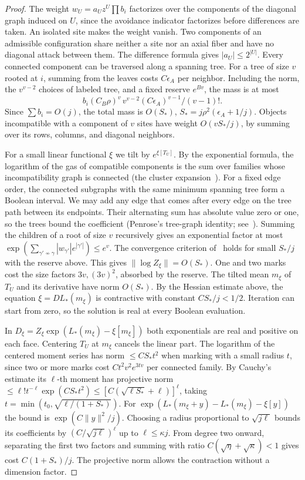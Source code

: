 \begin{proof}
The weight \(w_U=a_Uz^U\prod b_i\) factorizes over the components of the diagonal graph induced on \(U\),
since the avoidance indicator factorizes before differences are taken. An isolated site makes the weight
vanish. Two components of an admissible configuration share neither a site nor an axial fiber and have no
diagonal attack between them. The difference formula gives \(|a_U|\le2^{|U|}\). Every connected component
can be traversed along a spanning tree. For a tree of size \(v\) rooted at \(i\), summing from the leaves
costs \(C\epsilon_A\) per neighbor. Including the norm, the \(v^{v-2}\) choices of labeled tree, and a
fixed reserve \(e^{Bv}\), the mass is at most
\[
 b_i(C_B\rho)^v\,v^{v-2}(C\epsilon_A)^{v-1}/(v-1)! .
\]
Since \(\sum b_i=O(j)\), the total mass is \(O(S_*)\), \(S_*=j\rho^2(\epsilon_A+1/j)\). Objects
incompatible with a component of \(v\) sites have weight \(O(vS_*/j)\), by summing over its rows,
columns, and diagonal neighbors.

For a small linear functional \(\xi\) we tilt by \(e^{\xi[T_U]}\). By the exponential formula, the
logarithm of the gas of compatible components is the sum over families whose incompatibility graph is
connected (the cluster
expansion~\cite{kp,fp}). For a fixed edge order, the connected subgraphs with the same minimum spanning
tree form a
Boolean interval. We may add any edge that comes after every edge on the tree path between its endpoints.
Their alternating sum has absolute value zero or one, so the trees bound the coefficient (Penrose's
tree-graph identity; see~\cite{fp}). Summing the
children of a root of size \(v\) recursively gives an exponential factor at most
\(\exp(\sum_{\gamma'\not\sim\gamma}|w_{\gamma'}|e^{|\gamma'|})\le e^v\). The convergence criterion
of~\cite{kp} holds for small \(S_*/j\) with the reserve above. This gives \(\|\log Z_\xi\|=O(S_*)\). One
and two marks cost the size
factors \(3v,(3v)^2\), absorbed by the reserve. The tilted mean \(m_\xi\) of \(T_U\) and its derivative
have norm \(O(S_*)\). By the Hessian estimate above, the equation \(\xi=DL_*(m_\xi)\) is contractive with
constant \(CS_*/j<1/2\). Iteration can start from zero, so the solution is real at every Boolean
evaluation.

In \(D_\xi=Z_\xi\exp(L_*(m_\xi)-\xi[m_\xi])\) both exponentials are real and positive on each face.
Centering \(T_U\) at \(m_\xi\) cancels the linear part. The logarithm of the centered moment series has
norm \(\le CS_* t^2\) when marking with a small radius \(t\), since two or more marks cost \(C t^2v^2
e^{3tv}\) per connected family. By Cauchy's estimate its \(\ell\)-th moment has projective norm
\(\le\ell!t^{-\ell}\exp(CS_*t^2)\le[C(\sqrt{\ell S_*}+\ell)]^\ell\), taking
\(t=\min(t_0,\sqrt{\ell/(1+S_*)})\). For \(\exp(L_*(m_\xi+y)-L_*(m_\xi)-\xi[y])\) the bound is
\(\exp(C\|y\|^2/j)\). Choosing a radius proportional to \(\sqrt{j\ell}\) bounds its coefficients by
\((C/\sqrt{j\ell})^\ell\) up to \(\ell\le\kappa j\). From degree two onward, separating the first two
factors and summing with ratio \(C(\sqrt{\eta}+\sqrt\kappa)<1\) gives cost \(C(1+S_*)/j\). The projective
norm allows the contraction without a dimension factor.


\end{proof}
